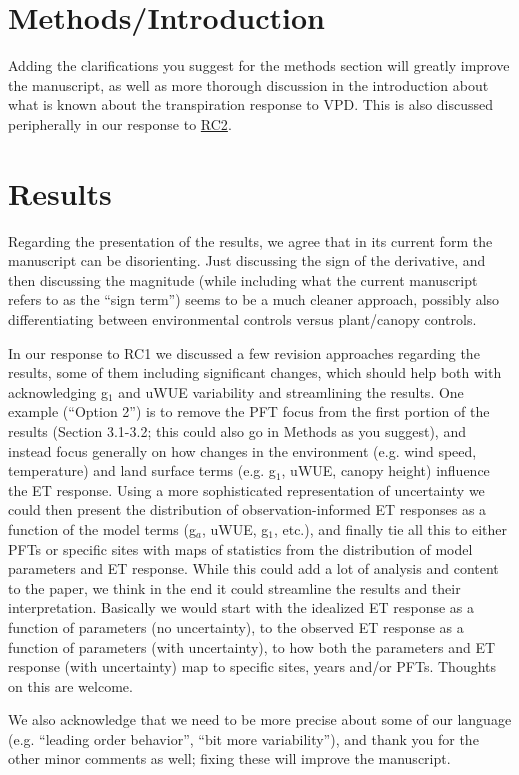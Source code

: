 \documentclass[12pt]{article}
\begin{document}
\section{Methods/Introduction}
Adding the clarifications you suggest for the methods section will
greatly improve the manuscript, as well as more thorough discussion in
the introduction about what is known about the transpiration response to
VPD. This is also discussed peripherally in our response to
\href{https://editor.copernicus.org/index.php/hess-2018-553-RC2.pdf?_mdl=msover_md&_jrl=13&_lcm=oc108lcm109w&_acm=get_comm_file&_ms=72556&c=153384&salt=74148443849227084}{RC2}.

\section{Results}
Regarding the presentation of the results, we agree that in its current
form the manuscript can be disorienting. Just discussing the sign of
the derivative, and then discussing the magnitude (while including
what the current manuscript refers to as the ``sign term'') seems to
be a much cleaner approach, possibly also differentiating between
environmental controls versus plant/canopy controls.

In our response to RC1 we discussed a few revision approaches
regarding the results, some of them including significant changes,
which should help both with acknowledging g$_1$ and uWUE variability
and streamlining the results. One example (``Option 2'') is to remove
the PFT focus from the first portion of the results (Section 3.1-3.2;
this could also go in Methods as you suggest), and instead focus
generally on how changes in the environment (e.g. wind speed,
temperature) and land surface terms (e.g. g$_1$, uWUE, canopy height)
influence the ET response. Using a more sophisticated representation
of uncertainty we could then present the distribution of
observation-informed ET responses as a function of the model terms
(g$_a$, uWUE, g$_1$, etc.), and finally tie all this to either PFTs or
specific sites with maps of statistics from the distribution of model
parameters and ET response. While this could add a lot of analysis and
content to the paper, we think in the end it could streamline the
results and their interpretation. Basically we would start with the
idealized ET response as a function of parameters (no uncertainty), to
the observed ET response as a function of parameters (with
uncertainty), to how both the parameters and ET response (with
uncertainty) map to specific sites, years and/or PFTs. Thoughts on
this are welcome.

We also acknowledge that we need to be more precise about some of our
language (e.g. ``leading order behavior'', ``bit more variability''),
and thank you for the other minor comments as well; fixing these will
improve the manuscript.
\end{document}
